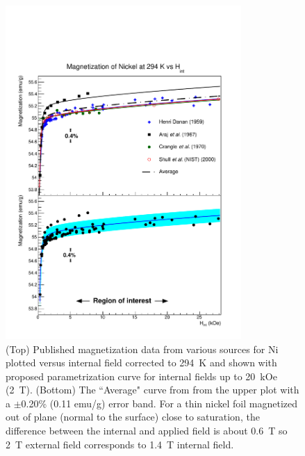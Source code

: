 \documentclass[preprint,12pt]{elsarticle}
\begin{document}
\begin{figure}
\centering
\includegraphics[width=0.8\textwidth]{NiParameterizationErrorBand_vs_Hint.pdf}
\caption{(Top) Published magnetization data from various sources for Ni plotted versus internal field corrected to 294~K and shown with proposed parametrization curve for internal fields up to 20~kOe (2~T). (Bottom) The ``Average" curve from from the upper plot with a $\pm$0.20\% (0.11 emu/g) error band. For a thin nickel foil magnetized out of plane (normal to the surface) close to saturation, the difference between the internal and applied field is about 0.6~T so 2~T external field corresponds to 1.4~T internal field.}
\label{fig:mag_errorband_Ni}
\end{figure}
\FloatBarrier
\end{document}
